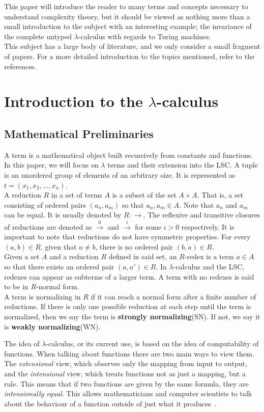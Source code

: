 \documentclass[11pt]{article}
\begin{document}
This paper will introduce the reader to many terms and concepts necessary to understand complexity theory, but it should be viewed as nothing more than a small introduction to the subject with an interesting example; the invariance of the complete untyped $\lambda$-calculus with regards to Turing machines. \\
This subject has a large body of literature, and we only consider a small fragment of papers. For a more detailed introduction to the topics mentioned, refer to the references.

\section{Introduction to the $\lambda$-calculus}\label{intro-lambda}
 \subsection{Mathematical Preliminaries}
 A term is a mathematical object built recursively from constants and functions. In this paper, we will focus on $\lambda$ terms and their extension into the LSC.
 A tuple is an unordered group of elements of an arbitrary size. It is represented as $t = (x_1,x_2,...,x_n)$. \\
 A reduction $R$ in a set of terms $A$ is a subset of the set $A \times A$. That is, a set consisting of ordered pairs $(a_n,a_m)$ so that $a_n,a_m \in A$. Note that $a_n$ and $a_m$ can be equal. It is usually denoted by $R : \rightarrow$.
 The reflexive and transitive closures of reductions are denoted as $\xrightarrow{0}$ and $\xrightarrow{i}$ for some $i > 0$ respectively. It is important to note that reductions do not have symmetric properties. For every $(a,b) \in R$, given that $a \neq b$, there is no ordered pair $(b,a) \in R$. \\
 Given a set $A$ and a reduction $R$ defined in said set, an $R$-redex is a term $a \in A$ so that there exists an ordered pair $(a,a') \in R$. In $\lambda$-calculus and the LSC, redexes can appear as subterms of a larger term. A term with no redexes is said to be in $R$-normal form. \\
 A term is normalizing in $R$ if it can reach a normal form after a finite number of reductions. If there is only one possible reduction at each step until the term is normalized, then we say the term is \textbf{strongly normalizing}(SN). If not, we say it is \textbf{weakly normalizing}(WN).

The idea of $\lambda$-calculus, or its current use, is based on the idea of computability of functions. When talking about functions there are two main ways to view them. The \textit{extensional} view, which observes only the mapping from input to output, and the \textit{intensional} view, which treats functions not as just a mapping, but a rule. This means that if two functions are given by the same formula, they are \textit{intensionally equal}. This allows mathematicians and computer scientists to talk about the behaviour of a function outside of just what it produces~\cite{selinger}.
\end{document}
